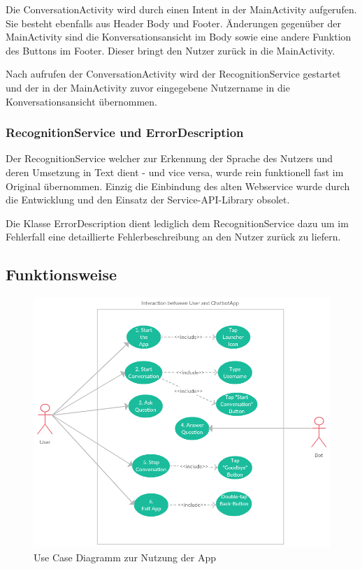 		Die ConversationActivity wird durch einen Intent in der MainActivity aufgerufen. Sie besteht ebenfalls aus Header Body und Footer. Änderungen gegenüber der MainActivity sind die Konversationsansicht im Body sowie eine andere Funktion des Buttons im Footer. Dieser bringt den Nutzer zurück in die MainActivity.
		
		Nach aufrufen der ConversationActivity wird der RecognitionService gestartet und der in der MainActivity zuvor eingegebene Nutzername in die Konversationsansicht übernommen. \\
				
		\subsubsection{RecognitionService und ErrorDescription}\label{recogError}
		Der RecognitionService welcher zur Erkennung der Sprache des Nutzers und deren Umsetzung in Text dient - und vice versa, wurde rein funktionell fast im Original übernommen. Einzig die Einbindung des alten Webservice wurde durch die Entwicklung und den Einsatz der Service-API-Library obsolet.
		
		Die Klasse ErrorDescription dient lediglich dem RecognitionService dazu um im Fehlerfall eine detaillierte Fehlerbeschreibung an den Nutzer zurück zu liefern.

	\subsection{Funktionsweise}\label{funktion}
	
	\begin{figure}[htbp]
		\centering
		\includegraphics[height=0.9\textwidth]{dh/graphics/UseCaseChatbotApp.png}
		\caption{Use Case Diagramm zur Nutzung der App}
		\label{fig:usecaseapp}
	\end{figure} \leavevmode \\
	
